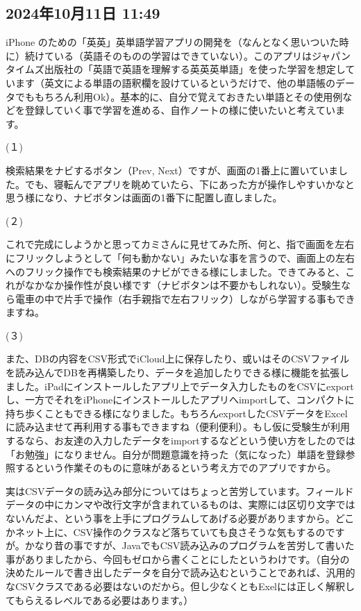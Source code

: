 \subsection*{2024年10月11日 11:49}

iPhone のための「英英」英単語学習アプリの開発を（なんとなく思いついた時に）続けている（英語そのものの学習はできていない）。このアプリはジャパンタイムズ出版社の「英語で英語を理解する英英英単語」を使った学習を想定しています（英文による単語の語釈欄を設けているというだけで、他の単語帳のデータでももちろん利用Ok）。基本的に、自分で覚えておきたい単語とその使用例などを登録していく事で学習を進める、自作ノートの様に使いたいと考えています。

(１)

検索結果をナビするボタン（Prev, Next）ですが、画面の1番上に置いていました。でも、寝転んでアプリを眺めていたら、下にあった方が操作しやすいかなと思う様になり、ナビボタンは画面の1番下に配置し直しました。

(２)

これで完成にしようかと思ってカミさんに見せてみた所、何と、指で画面を左右にフリックしようとして「何も動かない」みたいな事を言うので、画面上の左右へのフリック操作でも検索結果のナビができる様にしました。できてみると、これがなかなか操作性が良い様です（ナビボタンは不要かもしれない）。受験生なら電車の中で片手で操作（右手親指で左右フリック）しながら学習する事もできますね。

(３)

また、DBの内容をCSV形式でiCloud上に保存したり、或いはそのCSVファイルを読み込んでDBを再構築したり、データを追加したりできる様に機能を拡張しました。iPadにインストールしたアプリ上でデータ入力したものをCSVにexportし、一方でそれをiPhoneにインストールしたアプリへimportして、コンパクトに持ち歩くこともできる様になりました。もちろんexportしたCSVデータをExcelに読み込ませて再利用する事もできますね（便利便利）。もし仮に受験生が利用するなら、お友達の入力したデータをimportするなどという使い方をしたのでは「お勉強」になりません。自分が問題意識を持った（気になった）単語を登録参照するという作業そのものに意味があるという考え方でのアプリですから。

実はCSVデータの読み込み部分についてはちょっと苦労しています。フィールドデータの中にカンマや改行文字が含まれているものは、実際には区切り文字ではないんだよ、という事を上手にプログラムしてあげる必要がありますから。どこかネット上に、CSV操作のクラスなど落ちていても良さそうな気もするのですが。かなり昔の事ですが、JavaでもCSV読み込みのプログラムを苦労して書いた事がありましたから、今回もゼロから書くことにしたというわけです。（自分の決めたルールで書き出したデータを自分で読み込むということであれば、汎用的なCSVクラスである必要はないのだから。但し少なくともExelには正しく解釈してもらえるレベルである必要はあります。）

